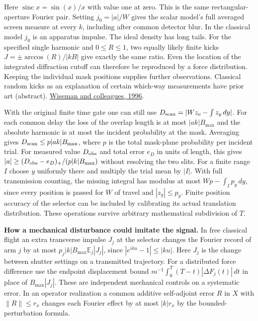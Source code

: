 \documentclass[11pt,a4paper]{article}
\begin{document}
Here \(\operatorname{sinc}x=\sin(x)/x\) with value one at zero. This is
the same rectangular-aperture Fourier pair. Setting \(j_0=|a|/W\) gives
the scalar model's full averaged screen measure at every \(k\),
including after common detector blur. In the classical model \(j_0\) is
an apparatus impulse. The ideal density has long tails. For the
specified single harmonic and \(0\le R\le1\), two equally likely finite
kicks \(J=\pm\arccos(R)/|kB|\) give exactly the same ratio. Even the
location of the integrated diffraction cutoff can therefore be
reproduced by a force distribution. Keeping the individual mask
positions supplies further observations. Classical random kicks as an
explanation of certain which-way measurements have prior art (abstract).
\href{https://opg.optica.org/abstract.cfm?uri=iqec-1996-TuL115}{Wiseman
and colleagues, 1996}.

With the original finite time gate one can still use
\(D_{\rm scan}=|W z_o-\int z_y\,dy|\). For each common delay the loss of
the overlap length is at most \(|ak|B_{\max}\) and the absolute harmonic
is at most the incident probability at the mask. Averaging gives
\(D_{\rm scan}\le p|ak|B_{\max}\), where \(p\) is the total mask-plane
probability per incident trial. For measured value \(D_{\rm obs}\) and
total error \(e_D\) in units of length, this gives
\(|a|\ge(D_{\rm obs}-e_D)_+/(p|k|B_{\max})\) without resolving the two
slits. For a finite range \(I\) choose \(y\) uniformly there and
multiply the trial mean by \(|I|\). With full transmission counting, the
missing integral has modulus at most \(Wp-\int_I p_y\,dy\), since every
position is passed for \(W\) of travel and \(|z_y|\le p_y\). Finite
position accuracy of the selector can be included by calibrating its
actual translation distribution. These operations survive arbitrary
mathematical subdivision of \(T\).

\textbf{How a mechanical disturbance could imitate the signal.} In free
classical flight an extra transverse impulse \(J_j\) at the selector
changes the Fourier record of arm \(j\) by at most
\(p_j |k|B_{\max}\mathbb E_j|J_j|\), since \(|e^{iku}-1|\le |ku|\). Here
\(J_j\) is the change between shutter settings on a transmitted
trajectory. For a distributed force difference use the endpoint
displacement bound \(m^{-1}\int_0^T(T-t)|\Delta F_j(t)|\,dt\) in place
of \(B_{\max}|J_j|\). These are independent mechanical controls on a
systematic error. In an operator realization a common additive
self-adjoint error \(R\) in \(X\) with \(\|R\|\le r_x\) changes each
Fourier effect by at most \(|k|r_x\) by the bounded-perturbation
formula.
\end{document}
